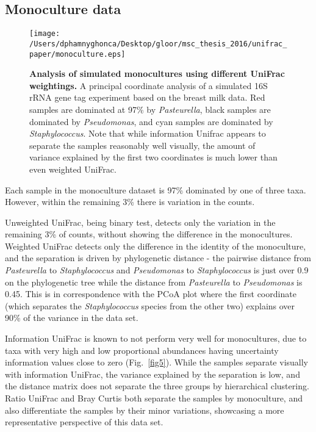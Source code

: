 \documentclass[10pt,letterpaper]{article}
\begin{document}
\FloatBarrier

\subsection{Monoculture data}

\begin{figure}[h]
\texttt{[image: /Users/dphamnyghonca/Desktop/gloor/msc\_thesis\_2016/unifrac\_paper/monoculture.eps]}
\caption[Analysis of simulated monocultures using different UniFrac weightings.]{{\bf Analysis of simulated monocultures using different UniFrac weightings. }
A principal coordinate analysis of a simulated 16S rRNA gene tag experiment based on the breast milk data. Red samples are dominated at 97\% by \textit{Pasteurella}, black samples are dominated by \textit{Pseudomonas}, and cyan samples are dominated by \textit{Staphylococcus}. Note that while information Unifrac appears to separate the samples reasonably well visually, the amount of variance explained by the first two coordinates is much lower than even weighted UniFrac.}
\label{fig8}
\end{figure}

Each sample in the monoculture dataset is 97\% dominated by one of three taxa. However, within the remaining 3\% there is variation in the counts.

Unweighted UniFrac, being binary test, detects only the variation in the remaining 3\% of counts, without showing the difference in the monocultures. Weighted UniFrac detects only the difference in the identity of the monoculture, and the separation is driven by phylogenetic distance - the pairwise distance from \textit{Pasteurella} to \textit{Staphylococcus} and \textit{Pseudomonas} to \textit{Staphylococcus} is just over 0.9 on the phylogenetic tree while the distance from \textit{Pasteurella} to \textit{Pseudomonas} is 0.45. This is in correspondence with the PCoA plot where the first coordinate (which separates the \textit{Staphylococcus} species from the other two) explains over 90\% of the variance in the data set.

Information UniFrac is known to not perform very well for monocultures, due to taxa with very high and low proportional abundances having uncertainty information values close to zero (Fig.~\ref{fig5}). While the samples separate visually with information UniFrac, the variance explained by the separation is low, and the distance matrix does not separate the three groups by hierarchical clustering. Ratio UniFrac and Bray Curtis both separate the samples by monoculture, and also differentiate the samples by their minor variations, showcasing a more representative perspective of this data set.
\end{document}
